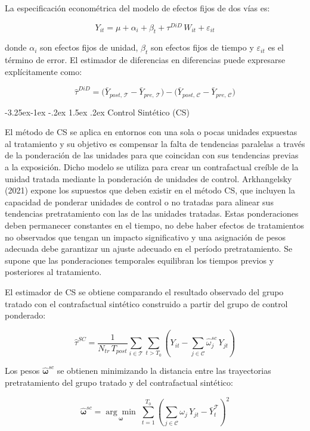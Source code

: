 \documentclass[12pt,a4paper]{article}
\makeatletter
\renewcommand\subsection{\@startsection{subsection}{2}{\z@}%
  {-3.25ex\@plus -1ex \@minus -.2ex}%
  {1.5ex \@plus .2ex}%
  {\normalfont\normalsize}}
\makeatother
\begin{document}
La especificación econométrica del modelo de efectos fijos de dos vías es:

\[
Y_{it} = \mu + \alpha_i + \beta_t + \tau^{DiD}\, W_{it} + \varepsilon_{it}
\]

donde $\alpha_i$ son efectos fijos de unidad, $\beta_t$ son efectos fijos de tiempo y $\varepsilon_{it}$ es el término de error. El estimador de diferencias en diferencias puede expresarse explícitamente como:

\[
\hat{\tau}^{DiD} = \bigl(\bar{Y}_{post,\,\mathcal{T}} - \bar{Y}_{pre,\,\mathcal{T}}\bigr) - \bigl(\bar{Y}_{post,\,\mathcal{C}} - \bar{Y}_{pre,\,\mathcal{C}}\bigr)
\]


\subsection{Control Sintético (CS)}

El método de CS se aplica en entornos con una sola o pocas unidades expuestas al tratamiento y su objetivo es compensar la falta de tendencias paralelas a través de la ponderación de las unidades para que coincidan con sus tendencias previas a la exposición. Dicho modelo se utiliza para crear un contrafactual creíble de la unidad tratada mediante la ponderación de unidades de control. Arkhangelsky (2021) expone los supuestos que deben existir en el método CS, que incluyen la capacidad de ponderar unidades de control o no tratadas para alinear sus tendencias pretratamiento con las de las unidades tratadas. Estas ponderaciones deben permanecer constantes en el tiempo, no debe haber efectos de tratamientos no observados que tengan un impacto significativo y una asignación de pesos adecuada debe garantizar un ajuste adecuado en el período pretratamiento. Se supone que las ponderaciones temporales equilibran los tiempos previos y posteriores al tratamiento.

El estimador de CS se obtiene comparando el resultado observado del grupo tratado con el contrafactual sintético construido a partir del grupo de control ponderado:

\[
\hat{\tau}^{SC} = \frac{1}{N_{tr}\,T_{post}} \sum_{i \in \mathcal{T}}\sum_{t > T_0} \left(Y_{it} - \sum_{j \in \mathcal{C}} \hat{\omega}_j^{sc}\,Y_{jt}\right)
\]

Los pesos $\hat{\boldsymbol{\omega}}^{sc}$ se obtienen minimizando la distancia entre las trayectorias pretratamiento del grupo tratado y del contrafactual sintético:

\[
\hat{\boldsymbol{\omega}}^{sc} = \underset{\boldsymbol{\omega}}{\arg\min}\;\sum_{t=1}^{T_0} \left(\sum_{j \in \mathcal{C}} \omega_j\,Y_{jt} - \bar{Y}_t^{\mathcal{T}}\right)^{\!2}
\]
\end{document}
